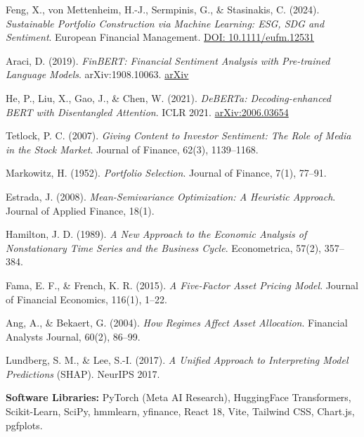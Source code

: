 \documentclass[12pt, a4paper]{article}
\begin{document}
\begin{enumerate}[leftmargin=2em, itemsep=4pt, label={[\arabic*]}]
    \item Feng, X., von Mettenheim, H.-J., Sermpinis, G., \& Stasinakis, C. (2024). \textit{Sustainable Portfolio Construction via Machine Learning: ESG, SDG and Sentiment}. European Financial Management. \href{https://doi.org/10.1111/eufm.12531}{DOI: 10.1111/eufm.12531}

    \item Araci, D. (2019). \textit{FinBERT: Financial Sentiment Analysis with Pre-trained Language Models}. arXiv:1908.10063. \href{https://arxiv.org/abs/1908.10063}{arXiv}

    \item He, P., Liu, X., Gao, J., \& Chen, W. (2021). \textit{DeBERTa: Decoding-enhanced BERT with Disentangled Attention}. ICLR 2021. \href{https://arxiv.org/abs/2006.03654}{arXiv:2006.03654}

    \item Tetlock, P. C. (2007). \textit{Giving Content to Investor Sentiment: The Role of Media in the Stock Market}. Journal of Finance, 62(3), 1139--1168.

    \item Markowitz, H. (1952). \textit{Portfolio Selection}. Journal of Finance, 7(1), 77--91.

    \item Estrada, J. (2008). \textit{Mean-Semivariance Optimization: A Heuristic Approach}. Journal of Applied Finance, 18(1).

    \item Hamilton, J. D. (1989). \textit{A New Approach to the Economic Analysis of Nonstationary Time Series and the Business Cycle}. Econometrica, 57(2), 357--384.

    \item Fama, E. F., \& French, K. R. (2015). \textit{A Five-Factor Asset Pricing Model}. Journal of Financial Economics, 116(1), 1--22.

    \item Ang, A., \& Bekaert, G. (2004). \textit{How Regimes Affect Asset Allocation}. Financial Analysts Journal, 60(2), 86--99.

    \item Lundberg, S. M., \& Lee, S.-I. (2017). \textit{A Unified Approach to Interpreting Model Predictions} (SHAP). NeurIPS 2017.

    \item \textbf{Software Libraries:} PyTorch (Meta AI Research), HuggingFace Transformers, Scikit-Learn, SciPy, hmmlearn, yfinance, React 18, Vite, Tailwind CSS, Chart.js, pgfplots.
\end{enumerate}
\end{document}
